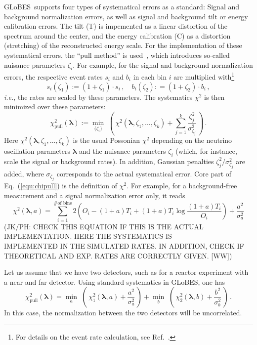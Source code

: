 \documentclass[12pt,a4paper]{article}
\newcommand{\ie}{{\it i.e.}}
\newcommand{\eq}{Eq.}
\newcommand{\Ref}{Ref.}
\newcommand{\GLOBES}{{\sf GLoBES}}
\newcommand{\equ}[1]{\eq~(\ref{equ:#1})}
\begin{document}
\GLOBES\ supports four types of systematical errors as a standard: Signal and background
normalization errors, as well as signal and background tilt or energy calibration errors.
The tilt (T) is impemented as a linear distortion of the spectrum around the center,
and the energy calibration (C) as a distortion (stretching) of the reconstructed energy scale.
For the implementation of these systematical errors, the  ``pull method'' is used~\cite{Fogli:2002pt}, which introduces  so-called nuisance parameters $\zeta_i$. 
For example, for the signal and background normalization errors, the respective event rates 
$s_i$ and $b_i$ in
each bin $i$ are multiplied with\footnote{For details on the event rate calculation, see \Ref~\cite{Huber:2004ka}.}
\begin{equation}
s_i(\zeta_1) := (1+\zeta_1)\cdot s_i \, , \quad b_i(\zeta_2) : =(1+\zeta_2)\cdot b_i \, ,
\end{equation} 
\ie, the rates are scaled by these parameters. The systematics $\chi^2$ is then minimized over
these parameters:
\begin{equation}
\chi^2_\mathrm{pull}(\boldsymbol{\lambda}):=\min_{\{\zeta_i\} } \,\, \left( \,
\chi^2(\boldsymbol{\lambda},
\zeta_1, \ldots, \zeta_k)+ \sum_{j=1}^{k} \frac{\zeta_j^2}{\sigma_{\zeta_j}^2}
\, \right)\,.
\label{equ:chipull}
\end{equation}
Here $\chi^2(\boldsymbol{\lambda}, \zeta_1, \ldots, \zeta_k)$ is the usual Possonian $\chi^2$
depending on the neutrino oscillation parameters $\boldsymbol{\lambda}$ and the nuisance
parameters $\zeta_i$ (which, for instance, scale the signal or background rates).
In addition, Gaussian penalties $\zeta_j^2/\sigma_{\zeta_j}^2$ are added, where 
$\sigma_{\zeta_j}$ corresponds to the actual systematical error.
Core part of \equ{chipull} is the definition of $\chi^2$. For example, for a background-free measurement and
a signal normalization error only, it reads
\begin{equation}
  \chi^2 (\boldsymbol{\lambda},a) =  \sum_{i=1}^{\textrm{\# of bins}}2
     \left( O_{i} - (1 + a) T_{i} +
       (1 + a) T_{i} \log \frac{(1 + a) T_{i}}{O_{i}}  \right) + \frac{a^2}{\sigma_a^2} 
\label{equ:chistandard}
\end{equation}
(JK/PH: CHECK THIS EQUATION IF THIS IS THE ACTUAL IMPLEMENTATION. HERE THE SYSTEMATICS IS\\
IMPLEMENTED IN THE SIMULATED RATES. IN ADDITION, CHECK IF THEORETICAL AND EXP. RATES
ARE CORRECTLY GIVEN. [WW])

Let us assume that we have two detectors, such as for a reactor experiment with a near and
far detector. Using standard systematics in \GLOBES , one has
\begin{equation}
\chi^2_\mathrm{pull}(\boldsymbol{\lambda}) = \min_{a } \,\, \left( \,
\chi_1^2(\boldsymbol{\lambda},a)+ \frac{a^2}{\sigma_{a}^2} \, \right)
+\min_{ b } \,\, \left( \,
\chi_2^2(\boldsymbol{\lambda},b)+ \frac{b^2}{\sigma_{b}^2}
\, \right)\,.
\label{equ:chipullex}
\end{equation}
In this case, the normalization between the two detectors will be uncorrelated.
\end{document}
